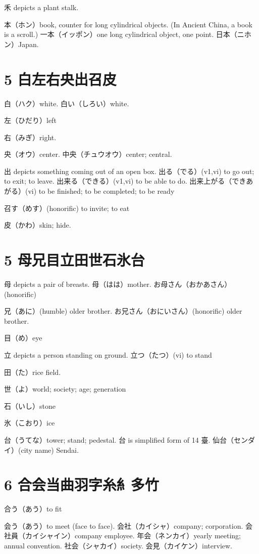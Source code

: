 禾 depicts a plant stalk.

本（ホン）book, counter for long cylindrical objects.
(In Ancient China, a book is a scroll.)
一本（イッポン）one long cylindrical object, one point.
日本（ニホン）Japan.

\section{5 白左右央出召皮}

白（ハク）white.
白い（しろい）white.

左（ひだり）left

右（みぎ）right.

央（オウ）center.
中央（チュウオウ）center; central.

出 depicts something coming out of an open box.
出る（でる）(v1,vi) to go out; to exit; to leave.
出来る（できる）(v1,vi) to be able to do.
出来上がる（できあがる）(vi) to be finished; to be completed; to be ready

召す（めす）(honorific) to invite; to eat

皮（かわ）skin; hide.

\section{5 母兄目立田世石氷台}

母 depicts a pair of breasts.
母（はは）mother.
お母さん（おかあさん）(honorific)

兄（あに）(humble) older brother.
お兄さん（おにいさん）(honorific) older brother.

目（め）eye

立 depicts a person standing on ground.
立つ（たつ）(vi) to stand

田（た）rice field.

世（よ）world; society; age; generation

石（いし）stone

氷（こおり）ice

台（うてな）tower; stand; pedestal.
台 is simplified form of 14 臺.
仙台（センダイ）(city name) Sendai.

\section{6 合会当曲羽字糸糹多竹}

合う（あう）to fit

会う（あう）to meet (face to face).
会社（カイシャ）company; corporation.
会社員（カイシャイン）company employee.
年会（ネンカイ）yearly meeting; annual convention.
社会（シャカイ）society.
会見（カイケン）interview.

